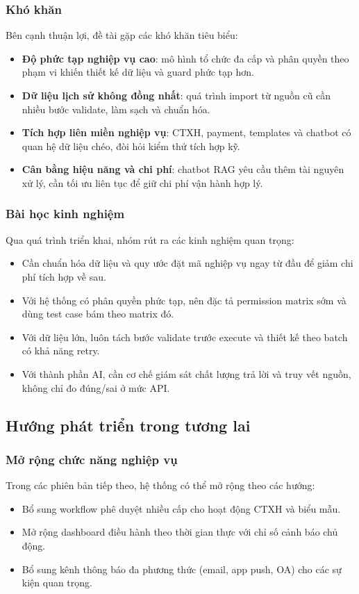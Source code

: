 \subsubsection{Khó khăn}
Bên cạnh thuận lợi, đề tài gặp các khó khăn tiêu biểu:
\begin{itemize}
	\item \textbf{Độ phức tạp nghiệp vụ cao}: mô hình tổ chức đa cấp và phân quyền theo phạm vi khiến thiết kế dữ liệu và guard phức tạp hơn.
	\item \textbf{Dữ liệu lịch sử không đồng nhất}: quá trình import từ nguồn cũ cần nhiều bước validate, làm sạch và chuẩn hóa.
	\item \textbf{Tích hợp liên miền nghiệp vụ}: CTXH, payment, templates và chatbot có quan hệ dữ liệu chéo, đòi hỏi kiểm thử tích hợp kỹ.
	\item \textbf{Cân bằng hiệu năng và chi phí}: chatbot RAG yêu cầu thêm tài nguyên xử lý, cần tối ưu liên tục để giữ chi phí vận hành hợp lý.
\end{itemize}

\subsubsection{Bài học kinh nghiệm}
Qua quá trình triển khai, nhóm rút ra các kinh nghiệm quan trọng:
\begin{itemize}
	\item Cần chuẩn hóa dữ liệu và quy ước đặt mã nghiệp vụ ngay từ đầu để giảm chi phí tích hợp về sau.
	\item Với hệ thống có phân quyền phức tạp, nên đặc tả permission matrix sớm và dùng test case bám theo matrix đó.
	\item Với dữ liệu lớn, luôn tách bước validate trước execute và thiết kế theo batch có khả năng retry.
	\item Với thành phần AI, cần cơ chế giám sát chất lượng trả lời và truy vết nguồn, không chỉ đo đúng/sai ở mức API.
\end{itemize}

\subsection{Hướng phát triển trong tương lai}

\subsubsection{Mở rộng chức năng nghiệp vụ}
Trong các phiên bản tiếp theo, hệ thống có thể mở rộng theo các hướng:
\begin{itemize}
	\item Bổ sung workflow phê duyệt nhiều cấp cho hoạt động CTXH và biểu mẫu.
	\item Mở rộng dashboard điều hành theo thời gian thực với chỉ số cảnh báo chủ động.
	\item Bổ sung kênh thông báo đa phương thức (email, app push, OA) cho các sự kiện quan trọng.
\end{itemize}

